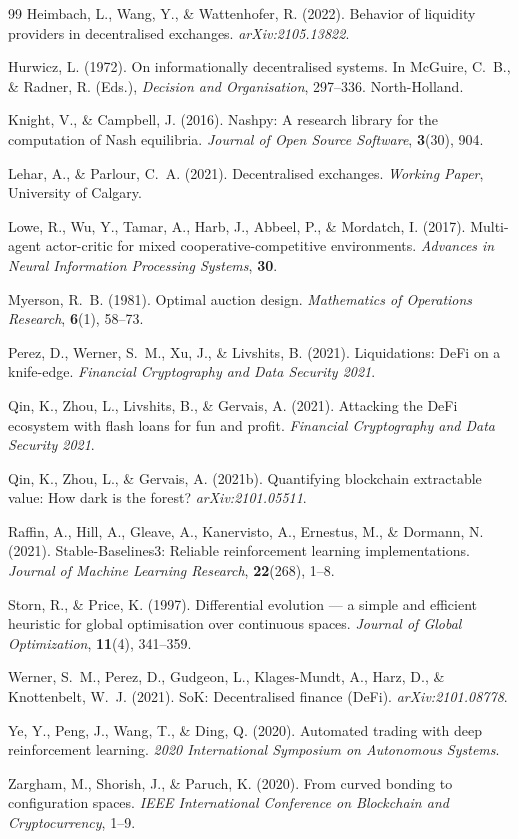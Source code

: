 \documentclass[10pt,twocolumn]{article}
\theoremstyle{plain}
\theoremstyle{definition}
\begin{document}
\begin{thebibliography}{99}
Heimbach, L., Wang, Y., \& Wattenhofer, R. (2022).
Behavior of liquidity providers in decentralised exchanges.
\textit{arXiv:2105.13822}.

Hurwicz, L. (1972).
On informationally decentralised systems.
In McGuire, C.~B., \& Radner, R. (Eds.),
\textit{Decision and Organisation}, 297--336.
North-Holland.

Knight, V., \& Campbell, J. (2016).
Nashpy: A research library for the computation of Nash
equilibria.
\textit{Journal of Open Source Software}, \textbf{3}(30), 904.

Lehar, A., \& Parlour, C.~A. (2021).
Decentralised exchanges.
\textit{Working Paper}, University of Calgary.

Lowe, R., Wu, Y., Tamar, A., Harb, J., Abbeel, P., \&
Mordatch, I. (2017).
Multi-agent actor-critic for mixed cooperative-competitive
environments.
\textit{Advances in Neural Information Processing Systems},
\textbf{30}.

Myerson, R.~B. (1981).
Optimal auction design.
\textit{Mathematics of Operations Research},
\textbf{6}(1), 58--73.

Perez, D., Werner, S.~M., Xu, J., \& Livshits, B. (2021).
Liquidations: DeFi on a knife-edge.
\textit{Financial Cryptography and Data Security 2021}.

Qin, K., Zhou, L., Livshits, B., \& Gervais, A. (2021).
Attacking the DeFi ecosystem with flash loans for fun and profit.
\textit{Financial Cryptography and Data Security 2021}.

Qin, K., Zhou, L., \& Gervais, A. (2021b).
Quantifying blockchain extractable value: How dark is the forest?
\textit{arXiv:2101.05511}.

Raffin, A., Hill, A., Gleave, A., Kanervisto, A.,
Ernestus, M., \& Dormann, N. (2021).
Stable-Baselines3: Reliable reinforcement learning implementations.
\textit{Journal of Machine Learning Research},
\textbf{22}(268), 1--8.

Storn, R., \& Price, K. (1997).
Differential evolution --- a simple and efficient heuristic
for global optimisation over continuous spaces.
\textit{Journal of Global Optimization},
\textbf{11}(4), 341--359.

Werner, S.~M., Perez, D., Gudgeon, L., Klages-Mundt, A.,
Harz, D., \& Knottenbelt, W.~J. (2021).
SoK: Decentralised finance (DeFi).
\textit{arXiv:2101.08778}.

Ye, Y., Peng, J., Wang, T., \& Ding, Q. (2020).
Automated trading with deep reinforcement learning.
\textit{2020 International Symposium on Autonomous Systems}.

Zargham, M., Shorish, J., \& Paruch, K. (2020).
From curved bonding to configuration spaces.
\textit{IEEE International Conference on Blockchain and
Cryptocurrency}, 1--9.

\end{thebibliography}
\end{document}
